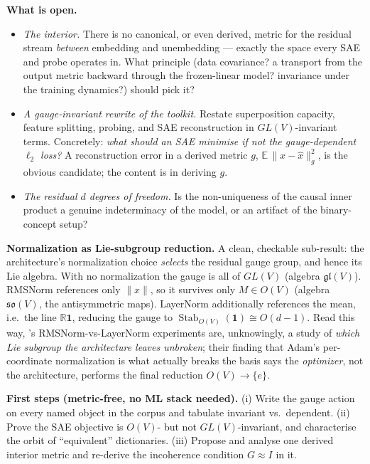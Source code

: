 \textbf{What is open.}
\begin{itemize}
\item \emph{The interior.} There is no canonical, or even derived, metric for the residual stream
  \emph{between} embedding and unembedding --- exactly the space every SAE and probe operates in.
  What principle (data covariance? a transport from the output metric backward through the
  frozen-linear model? invariance under the training dynamics?) should pick it?
\item \emph{A gauge-invariant rewrite of the toolkit.} Restate superposition capacity, feature
  splitting, probing, and SAE reconstruction in $GL(V)$-invariant terms. Concretely: \emph{what
  should an SAE minimise if not the gauge-dependent $\ell_2$ loss?} A reconstruction error in a
  derived metric $g$, $\mathbb{E}\,\lVert x-\hat x\rVert_g^2$, is the obvious candidate; the
  content is in deriving $g$.
\item \emph{The residual $d$ degrees of freedom.} Is the non-uniqueness of the causal inner
  product a genuine indeterminacy of the model, or an artifact of the binary-concept setup?
\end{itemize}

\textbf{Normalization as Lie-subgroup reduction.} A clean, checkable sub-result: the architecture's
normalization choice \emph{selects} the residual gauge group, and hence its Lie algebra. With no
normalization the gauge is all of $GL(V)$ (algebra $\mathfrak{gl}(V)$). RMSNorm references only
$\lVert x\rVert$, so it survives only $M\in O(V)$ (algebra $\mathfrak{so}(V)$, the antisymmetric
maps). LayerNorm additionally references the mean, i.e.\ the line $\mathbb{R}\mathbf 1$, reducing
the gauge to $\operatorname{Stab}_{O(V)}(\mathbf 1)\cong O(d-1)$. Read this way,
\textcite{privileged-bases-residual-stream}'s RMSNorm-vs-LayerNorm experiments are, unknowingly, a
study of \emph{which Lie subgroup the architecture leaves unbroken}; their finding that Adam's
per-coordinate normalization is what actually breaks the basis says the \emph{optimizer}, not the
architecture, performs the final reduction $O(V)\to\{e\}$.

\textbf{First steps (metric-free, no ML stack needed).} (i) Write the gauge action on every named
object in the corpus and tabulate invariant vs.\ dependent. (ii) Prove the SAE objective is
$O(V)$- but not $GL(V)$-invariant, and characterise the orbit of ``equivalent'' dictionaries.
(iii) Propose and analyse one derived interior metric and re-derive the incoherence condition
$G\approx I$ in it.

